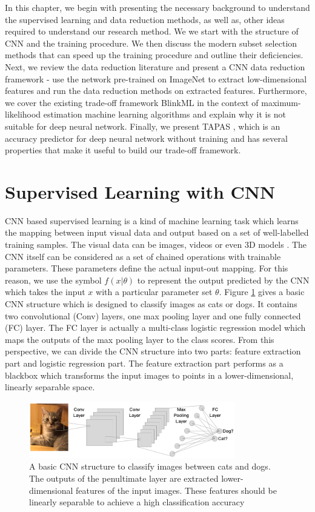 In this chapter, we begin with presenting the necessary background to understand the supervised learning and data reduction methods, as well as, other ideas required to understand our research method.  We we start with the structure of CNN and the training procedure. We then discuss the modern subset selection methods that can speed up the training procedure and outline their deficiencies. Next, we review the data reduction literature and present a CNN data reduction framework - use the network pre-trained on ImageNet to extract low-dimensional features and run the data reduction methods on extracted features. Furthermore, we cover the existing trade-off framework BlinkML \cite{Park2019a} in the context of maximum-likelihood estimation machine learning algorithms and explain why it is not suitable for deep neural network. Finally, we present TAPAS \cite{Istrate2019}, which is an accuracy predictor for deep neural network without training and has several properties that make it useful to build our trade-off framework.

\section{Supervised Learning with CNN}
CNN based supervised learning is a kind of machine learning task which learns the mapping between input visual data and output based on a set of well-labelled training samples. The visual data can be images, videos or even 3D models \cite{Song2020}. The CNN itself can be considered as a set of chained operations with trainable parameters. These parameters define the actual input-out mapping. For this reason, we use the symbol $f(x|\theta)$ to represent the output predicted by the CNN which takes the input $x$ with a particular parameter set $\theta$. Figure \ref{Fig.CNN} gives a basic CNN structure which is designed to classify images as cats or dogs. It contains two convolutional (Conv) layers, one max pooling layer and one fully connected (FC) layer. The FC layer is actually a multi-class logistic regression model which maps the outputs of the max pooling layer to the class scores. From this perspective, we can divide the CNN structure into two parts: feature extraction part and logistic regression part. The feature extraction part performs as a blackbox which transforms the input images to points in a lower-dimensional, linearly separable space.

 \begin{figure}[H]
 \centering
 \includegraphics[width=0.8\textwidth]{src/CNN.png}
 \caption{A basic CNN structure to classify images between cats and dogs. The outputs of the penultimate layer are extracted lower-dimensional features of the input images. These features should be linearly separable to achieve a high classification accuracy}
 \label{Fig.CNN}
 \end{figure}

